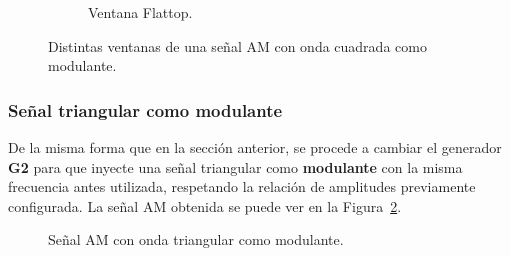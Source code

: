 \begin{figure}[H]
        \hfill 
        \begin{subfigure}[H]{0.44\textwidth}
          \caption{Ventana Flattop.}
        \end{subfigure}
      
        \caption{Distintas ventanas de una señal AM con onda cuadrada como modulante.}
        \label{fig:VentanasSeñalAMCuad}
      \end{figure}


    \subsubsection{Señal triangular como modulante}
      De la misma forma que en la sección anterior, se procede a cambiar el generador \textbf{G2} para que 
      inyecte una señal triangular como \textbf{modulante} con la misma frecuencia antes utilizada, 
      respetando la relación de amplitudes previamente configurada. La señal AM obtenida se puede ver en la 
      Figura~\ref{fig:SeñalAMConTriangular}.

      \begin{figure}[H]
        \centering
        \caption{Señal AM con onda triangular como modulante.}
        \label{fig:SeñalAMConTriangular}
      \end{figure}


